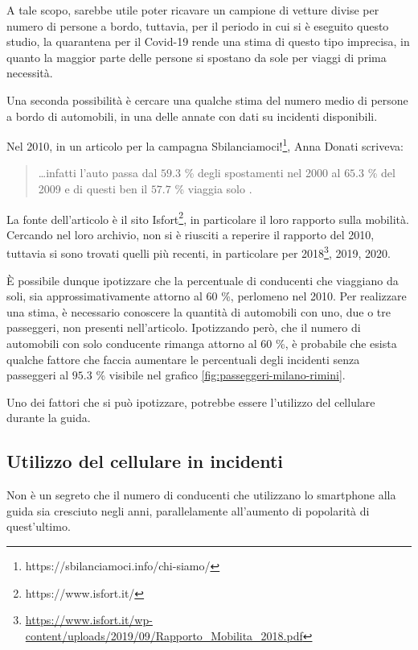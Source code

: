 \documentclass[a4paper]{report}
\begin{document}
A tale scopo, sarebbe utile poter ricavare un campione di vetture divise per 
numero di persone a bordo, tuttavia, per il periodo in cui si è eseguito questo 
studio, la quarantena per il Covid-19 rende una stima di questo tipo 
imprecisa, in quanto la maggior parte delle persone si spostano da sole 
per viaggi di prima necessità. 

Una seconda possibilità è cercare una qualche stima del numero medio di 
persone a bordo di automobili, in una delle annate con dati su incidenti disponibili. 

Nel 2010, in un articolo per la campagna 
Sbilanciamoci!\footnote{https://sbilanciamoci.info/chi-siamo/}, 
Anna Donati scriveva: 

\begin{quotation}
    \dots infatti l’auto passa dal $59.3$ \% degli spostamenti nel 2000 al $65.3$ \% del 
    2009 e di questi ben il $57.7$ \% viaggia solo \cite{SBILANCIAMOCI:1}. 
\end{quotation}

La fonte dell'articolo è il sito Isfort\footnote{https://www.isfort.it/}, 
in particolare il loro rapporto sulla mobilità. 
Cercando nel loro archivio, non si è riusciti a reperire il rapporto del 2010, 
tuttavia si sono trovati quelli più recenti, in particolare per 
2018\footnote{\url{https://www.isfort.it/wp-content/uploads/2019/09/Rapporto_Mobilita_2018.pdf}}, 
2019, 2020. 

\`E possibile dunque ipotizzare che la percentuale di conducenti che viaggiano 
da soli, sia approssimativamente attorno al $60$ \%, perlomeno nel 2010. 
Per realizzare una stima, è necessario conoscere la quantità di automobili con uno, 
due o tre passeggeri, non presenti nell'articolo. 
Ipotizzando però, che il numero di automobili con solo conducente rimanga attorno al 
$60$ \%, è probabile che esista qualche fattore che faccia aumentare le percentuali 
degli incidenti senza passeggeri al 
$95.3$ \% visibile nel grafico \ref{fig:passeggeri-milano-rimini}. 

Uno dei fattori che si può ipotizzare, potrebbe 
essere l'utilizzo del cellulare durante la guida. 


\subsection{Utilizzo del cellulare in incidenti}

Non è un segreto che il numero di conducenti 
che utilizzano lo smartphone alla guida 
sia cresciuto negli anni, parallelamente all'aumento di popolarità di quest'ultimo. 
\end{document}
